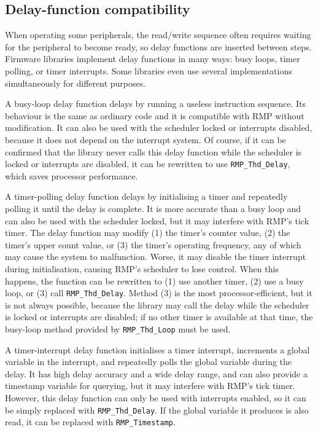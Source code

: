 \subsection{Delay-function compatibility}

When operating some peripherals, the read/write sequence often requires waiting for the peripheral to become ready, so delay functions are inserted between steps.
Firmware libraries implement delay functions in many ways: busy loops, timer polling, or timer interrupts.
Some libraries even use several implementations simultaneously for different purposes.

A busy-loop delay function delays by running a useless instruction sequence.
Its behaviour is the same as ordinary code and it is compatible with RMP without modification.
It can also be used with the scheduler locked or interrupts disabled, because it does not depend on the interrupt system.
Of course, if it can be confirmed that the library never calls this delay function while the scheduler is locked or interrupts are disabled, it can be rewritten to use \texttt{RMP\_Thd\_Delay}, which saves processor performance.

A timer-polling delay function delays by initialising a timer and repeatedly polling it until the delay is complete.
It is more accurate than a busy loop and can also be used with the scheduler locked, but it may interfere with RMP's tick timer.
The delay function may modify (1) the timer's counter value, (2) the timer's upper count value, or (3) the timer's operating frequency, any of which may cause the system to malfunction.
Worse, it may disable the timer interrupt during initialisation, causing RMP's scheduler to lose control.
When this happens, the function can be rewritten to (1) use another timer, (2) use a busy loop, or (3) call \texttt{RMP\_Thd\_Delay}.
Method (3) is the most processor-efficient, but it is not always possible, because the library may call the delay while the scheduler is locked or interrupts are disabled; if no other timer is available at that time, the busy-loop method provided by \texttt{RMP\_Thd\_Loop} must be used.

A timer-interrupt delay function initialises a timer interrupt, increments a global variable in the interrupt, and repeatedly polls the global variable during the delay.
It has high delay accuracy and a wide delay range, and can also provide a timestamp variable for querying, but it may interfere with RMP's tick timer.
However, this delay function can only be used with interrupts enabled, so it can be simply replaced with \texttt{RMP\_Thd\_Delay}.
If the global variable it produces is also read, it can be replaced with \texttt{RMP\_Timestamp}.

